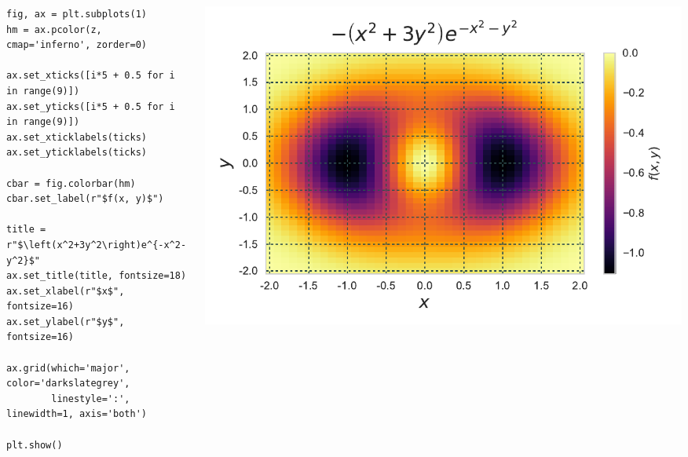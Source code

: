 \documentclass{beamer}
\begin{document}
\begin{frame}[fragile]
\tiny{
\begin{columns}
\begin{column}{0.45\textwidth}
\begin{verbatim}
fig, ax = plt.subplots(1)
hm = ax.pcolor(z, cmap='inferno', zorder=0)

ax.set_xticks([i*5 + 0.5 for i in range(9)])
ax.set_yticks([i*5 + 0.5 for i in range(9)])
ax.set_xticklabels(ticks)
ax.set_yticklabels(ticks)

cbar = fig.colorbar(hm)
cbar.set_label(r"$f(x, y)$")

title = r"$\left(x^2+3y^2\right)e^{-x^2-y^2}$"
ax.set_title(title, fontsize=18)
ax.set_xlabel(r"$x$", fontsize=16)
ax.set_ylabel(r"$y$", fontsize=16)

ax.grid(which='major', color='darkslategrey',
        linestyle=':', linewidth=1, axis='both')

plt.show()
\end{verbatim}
\end{column}
\begin{column}{0.55\textwidth}
\includegraphics[width=\textwidth]{heatmap_7.pdf}
\end{column}
\end{columns}
}
\end{frame}
\end{document}
